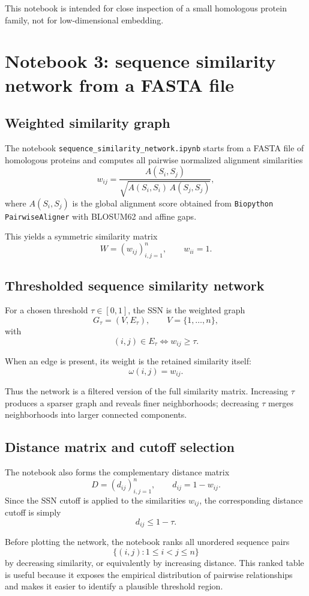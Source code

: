 \documentclass[11pt,a4paper]{article}
\begin{document}
This notebook is intended for close inspection of a small homologous protein family, not for low-dimensional embedding.

\section{Notebook 3: sequence similarity network from a FASTA file}

\subsection{Weighted similarity graph}

The notebook \texttt{sequence\_similarity\_network.ipynb} starts from a FASTA file of homologous proteins and computes all pairwise normalized alignment similarities
\[
w_{ij}=\frac{A(S_i,S_j)}{\sqrt{A(S_i,S_i)\,A(S_j,S_j)}},
\]
where $A(S_i,S_j)$ is the global alignment score obtained from \texttt{Biopython PairwiseAligner} with BLOSUM62 and affine gaps.

This yields a symmetric similarity matrix
\[
W=(w_{ij})_{i,j=1}^n,\qquad w_{ii}=1.
\]

\subsection{Thresholded sequence similarity network}

For a chosen threshold $\tau\in[0,1]$, the SSN is the weighted graph
\[
G_\tau=(V,E_\tau),\qquad V=\{1,\dots,n\},
\]
with
\[
(i,j)\in E_\tau \iff w_{ij}\ge \tau.
\]

When an edge is present, its weight is the retained similarity itself:
\[
\omega(i,j)=w_{ij}.
\]

Thus the network is a filtered version of the full similarity matrix. Increasing $\tau$ produces a sparser graph and reveals finer neighborhoods; decreasing $\tau$ merges neighborhoods into larger connected components.

\subsection{Distance matrix and cutoff selection}

The notebook also forms the complementary distance matrix
\[
D=(d_{ij})_{i,j=1}^n,\qquad d_{ij}=1-w_{ij}.
\]
Since the SSN cutoff is applied to the similarities $w_{ij}$, the corresponding distance cutoff is simply
\[
d_{ij}\le 1-\tau.
\]

Before plotting the network, the notebook ranks all unordered sequence pairs
\[
\{(i,j):1\le i<j\le n\}
\]
by decreasing similarity, or equivalently by increasing distance. This ranked table is useful because it exposes the empirical distribution of pairwise relationships and makes it easier to identify a plausible threshold region.
\end{document}
